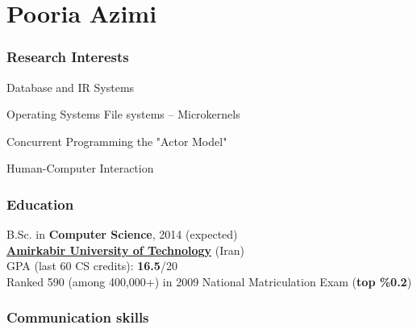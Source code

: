 \documentclass{tccv}
\begin{document}
\thispagestyle{empty}
\part{Pooria Azimi}





\section{Research Interests}


\begin{research_interest}

\item{Database and IR Systems}
     {}

\item{Operating Systems}
     {File systems -- Microkernels}

\item{Concurrent Programming}
     {the "Actor Model"}

\item{Human-Computer Interaction}
     {}

\end{research_interest}





\vspace{6.5pt}



\section{Education}

B.Sc. in {\bf Computer Science}, 2014 (expected)
\\[1.5pt]
{\bf \href{https://en.wikipedia.org/wiki/Amirkabir_University_of_Technology}{Amirkabir University of Technology}} (Iran)
\\[1.7pt]
GPA (last 60 CS credits): {\bf 16.5}/20
\bigskip\\
Ranked 590 (among 400,000+) in 2009 National Matriculation Exam ({\bf top \%0.2})



\vspace{10pt}




\section{Communication skills}
\end{document}
